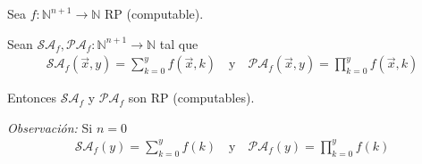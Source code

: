 \begin{teorema}{}{}
    Sea $f: \mathbb{N}^{n+1} \to \mathbb{N}$ RP (computable).

    Sean $\mathcal{SA}_f, \mathcal{PA}_f: \mathbb{N}^{n+1} \to \mathbb{N}$ 
    tal que
    \begin{gather*}
        \mathcal{SA}_f (\overrightarrow{x}, y) = 
        \sum_{k=0}^{y} f (\overrightarrow{x}, k) 
        \quad \text{y} \quad
        \mathcal{PA}_f (\overrightarrow{x},y) 
        = \prod_{k=0}^{y} f(\overrightarrow{x},k)
    \end{gather*}

    
    \medskip

    Entonces $\mathcal{SA}_f$ y $\mathcal{PA}_f$ son RP (computables).
\end{teorema}
\bigskip
\textit{Observación:}
Si $n=0$
\begin{gather*}
    \mathcal{SA}_f(y) = \sum_{k=0}^y f(k)
    \quad \text{y} \quad
    \mathcal{PA}_f (y) = \prod_{k=0}^y f(k)
\end{gather*}


